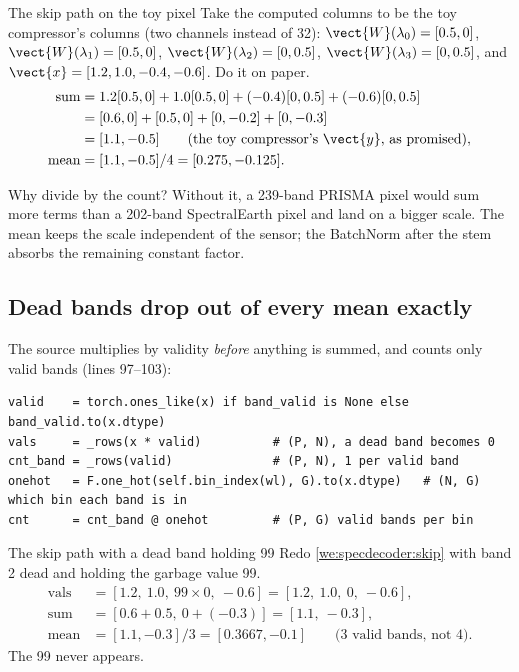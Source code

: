 \begin{worked}[label={we:specdecoder:skip}]{The skip path on the toy pixel}
Take the computed columns to be the toy compressor's columns (two channels instead of 32):
$\vect{W}(\lambda_0) = [0.5, 0]$, $\vect{W}(\lambda_1) = [0.5, 0]$, $\vect{W}(\lambda_2) = [0, 0.5]$, $\vect{W}(\lambda_3) = [0, 0.5]$, and $\vect{x} = [1.2, 1.0, -0.4, -0.6]$. Do it on paper.
\begin{align*}
  \text{sum} &= 1.2[0.5, 0] + 1.0[0.5, 0] + (-0.4)[0, 0.5] + (-0.6)[0, 0.5]\\
  &= [0.6, 0] + [0.5, 0] + [0, -0.2] + [0, -0.3]\\
  &= [1.1, -0.5] \qquad\text{(the toy compressor's }\vect{y}\text{, as promised)},\\
  \text{mean} &= [1.1, -0.5]/4 = [0.275, -0.125].
\end{align*}
\end{worked}

Why divide by the count? Without it, a 239-band PRISMA pixel would sum more terms than a 202-band SpectralEarth pixel and land on a bigger scale. The mean keeps the scale independent of the sensor; the BatchNorm after the stem absorbs the remaining constant factor.

\subsection{Dead bands drop out of every mean exactly}

The source multiplies by validity \emph{before} anything is summed, and counts only valid bands (lines 97--103):
\begin{lstlisting}
valid    = torch.ones_like(x) if band_valid is None else band_valid.to(x.dtype)
vals     = _rows(x * valid)          # (P, N), a dead band becomes 0
cnt_band = _rows(valid)              # (P, N), 1 per valid band
onehot   = F.one_hot(self.bin_index(wl), G).to(x.dtype)   # (N, G) which bin each band is in
cnt      = cnt_band @ onehot         # (P, G) valid bands per bin
\end{lstlisting}

\begin{worked}[label={we:specdecoder:skipdead}]{The skip path with a dead band holding 99}
Redo \cref{we:specdecoder:skip} with band 2 dead and holding the garbage value 99.
\begin{align*}
  \text{vals} &= [1.2,\ 1.0,\ 99\times0,\ -0.6] = [1.2,\ 1.0,\ 0,\ -0.6],\\
  \text{sum} &= [0.6 + 0.5,\ 0 + (-0.3)] = [1.1,\ -0.3],\\
  \text{mean} &= [1.1, -0.3]/3 = [0.3667, -0.1] \qquad\text{(3 valid bands, not 4).}
\end{align*}
The 99 never appears.
\end{worked}

